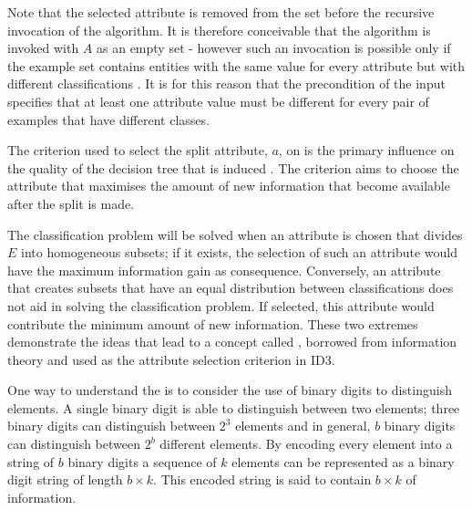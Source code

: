 \documentclass[twoside,11pt]{article}
\begin{document}
Note that the selected attribute is removed from the set before the recursive invocation of the algorithm. It is therefore conceivable that the algorithm is invoked with $A$ as an empty set - however such an invocation is possible only if the example set contains entities with the same value for every attribute but with different classifications \cite{bratko:learning}.  It is for this reason that the precondition of the input specifies that at least one attribute value must be different for every pair of examples that have different classes.

The criterion used to select the split attribute, $a$, on  is the primary influence on the quality of the decision tree that is induced \cite{kubat:review}. The  criterion aims to choose the attribute that maximises the amount of new information that become available after the split is made. 

The classification problem will be solved when an attribute is chosen that divides $E$ into homogeneous subsets; if it exists, the selection of such an attribute would have the maximum information gain as consequence.  Conversely, an attribute that creates subsets that have an equal distribution between classifications does not aid in solving the classification problem. If selected, this attribute would contribute the minimum amount of new information. These two extremes demonstrate the ideas that lead to a concept called  \cite{shannon:theory}, borrowed from information theory and used as the attribute selection criterion in ID3.


One way to understand the  is to consider the use of binary digits to distinguish elements.  A single  binary digit is able to distinguish between two elements; three binary digits can distinguish between $2^3$ elements and in general, $b$ binary digits can distinguish between $2^b$ different elements. By encoding every element into a string of $b$ binary digits a sequence of $k$ elements can be represented as a binary digit string of length $b \times k$.  This encoded string is said to contain $b \times k$  of information.  
\end{document}
